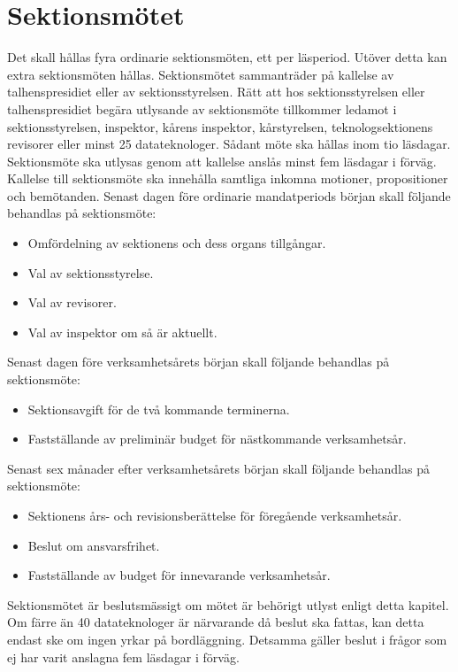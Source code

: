 \documentclass[a4paper]{dtek}
\begin{document}
\section{Sektionsmötet}
\para[Sammanträden] Det skall hållas fyra ordinarie sektionsmöten, ett per läsperiod. Utöver detta kan extra sektionsmöten hållas.
\para[Utlysande] Sektionsmötet sammanträder på kallelse av talhenspresidiet eller av sektionsstyrelsen.
\para Rätt att hos sektionsstyrelsen eller talhenspresidiet begära utlysande av sektionsmöte tillkommer ledamot i sektionsstyrelsen, inspektor, kårens inspektor, kårstyrelsen, teknologsektionens revisorer eller minst 25 datateknologer. Sådant möte ska hållas inom tio läsdagar.
\para Sektionsmöte ska utlysas genom att kallelse anslås minst fem läsdagar i förväg.
\para Kallelse till sektionsmöte ska innehålla samtliga inkomna motioner, propositioner och bemötanden.
\para[Åligganden] Senast dagen före ordinarie mandatperiods början skall följande behandlas på sektionsmöte:
\begin{itemize}
\item Omfördelning av sektionens och dess organs tillgångar.
\item Val av sektionsstyrelse.
\item Val av revisorer.
\item Val av inspektor om så är aktuellt.
\end{itemize}
\para Senast dagen före verksamhetsårets början skall följande behandlas på sektionsmöte:
\begin{itemize}
\item Sektionsavgift för de två kommande terminerna.
\item Fastställande av preliminär budget för nästkommande verksamhetsår.
\end{itemize}
\para Senast sex månader efter verksamhetsårets början skall följande behandlas på sektionsmöte:
\begin{itemize}
\item Sektionens års- och revisionsberättelse för föregående verksamhetsår.
\item Beslut om ansvarsfrihet.
\item Fastställande av budget för innevarande verksamhetsår.
\end{itemize}
\para[Beslutförhet] Sektionsmötet är beslutsmässigt om mötet är behörigt utlyst enligt detta kapitel.
\stycke
Om färre än 40 datateknologer är närvarande då beslut ska fattas, kan detta endast ske om ingen yrkar på bordläggning.
\stycke Detsamma gäller beslut i frågor som ej har varit anslagna fem läsdagar i förväg.
\end{document}
